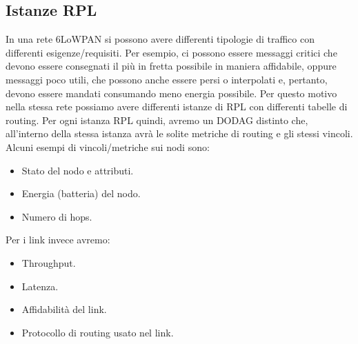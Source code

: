 \documentclass{article}
\begin{document}
\subsection{Istanze RPL}
In una rete 6LoWPAN si possono avere differenti tipologie di traffico con differenti esigenze/requisiti. Per esempio, ci possono essere messaggi critici che devono essere consegnati il più in fretta possibile in maniera affidabile, oppure messaggi poco utili, che possono anche essere persi o interpolati e, pertanto, devono essere mandati consumando meno energia possibile.
Per questo motivo nella stessa rete possiamo avere differenti istanze di RPL con differenti tabelle di routing. Per ogni istanza RPL quindi, avremo un DODAG distinto che, all'interno della stessa istanza avrà le solite metriche di routing e gli stessi vincoli. Alcuni esempi di vincoli/metriche sui nodi sono:
\begin{itemize}
    \item Stato del nodo e attributi.
    \item Energia (batteria) del nodo.
    \item Numero di hops.
\end{itemize}
Per i link invece avremo:
\begin{itemize}
    \item Throughput.
    \item Latenza.
    \item Affidabilità del link.
    \item Protocollo di routing usato nel link.
\end{itemize}
\end{document}

